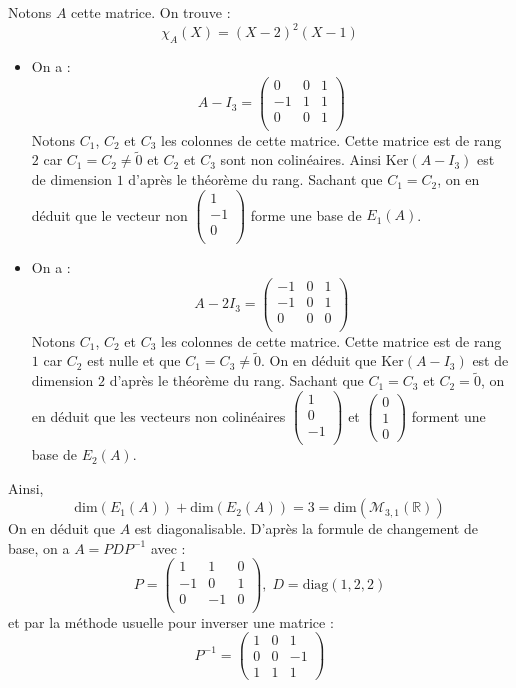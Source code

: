 \documentclass[a4paper,10pt]{report}
\begin{document}
\corr Notons $A$ cette matrice. On trouve :
$$ \chi_A(X) = (X-2)^2(X-1)$$
\begin{itemize}
\item On a : 
$$ A- I_3 = \begin{pmatrix}
0 & 0& 1 \\
-1 & 1 & 1 \\
0 & 0 & 1 \\
\end{pmatrix}$$
Notons $C_1$, $C_2$ et $C_3$ les colonnes de cette matrice. Cette matrice est de rang $2$ car $C_1=C_2 \neq \tilde{0}$ et $C_2$ et $C_3$ sont non colinéaires. Ainsi $\textrm{Ker}(A-I_3)$ est de dimension $1$ d'après le théorème du rang. Sachant que $C_1=C_2$, on en déduit que le vecteur non $\begin{pmatrix}
1 \\
-1 \\
0 \\
\end{pmatrix}$ forme une base de $E_1(A)$.
\item On a : 
$$ A- 2I_3 = \begin{pmatrix}
-1 & 0& 1 \\
-1 & 0 & 1 \\
0 & 0 & 0 \\
\end{pmatrix}$$
Notons $C_1$, $C_2$ et $C_3$ les colonnes de cette matrice. Cette matrice est de rang $1$ car $C_2$ est nulle et que $C_1=C_3 \neq \tilde{0}$. On en déduit que $\textrm{Ker}(A-I_3)$ est de dimension $2$ d'après le théorème du rang. Sachant que $C_1=C_3$ et $C_2= \tilde{0}$, on en déduit que les vecteurs non colinéaires $\begin{pmatrix}
1 \\
0 \\
-1 \\
\end{pmatrix}$ et $\begin{pmatrix}
0 \\
1 \\
0
\end{pmatrix}$ forment une base de $E_2(A)$. 
\end{itemize}
Ainsi,
$$ \textrm{dim}(E_1(A))+ \textrm{dim}(E_2(A)) = 3 = \textrm{dim}(\mathcal{M}_{3,1}(\mathbb{R}))$$
On en déduit que $A$ est diagonalisable. D'après la formule de changement de base, on a $A = PDP^{-1}$ avec :
$$ P = \begin{pmatrix}
1 & 1 & 0\\
-1 & 0 & 1 \\
0 & -1 & 0 \\
\end{pmatrix}, \; D=\textrm{diag}(1,2,2)$$
et par la méthode usuelle pour inverser une matrice :
$$ P^{-1} =  \begin{pmatrix}
1 & 0 & 1 \\
0 & 0 & -1 \\
1 & 1 & 1 
\end{pmatrix}$$
\end{document}
